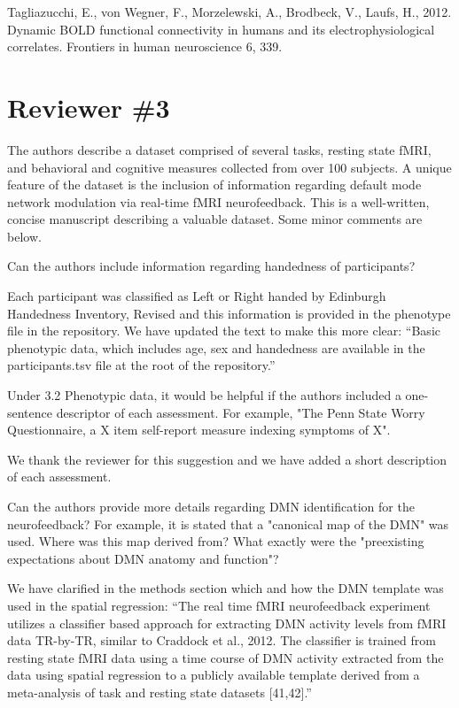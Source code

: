 \documentclass{article}
\newcommand{\RESPONSE}[1]{\textcolor{responseblue}{#1}}
\begin{document}
Tagliazucchi, E., von Wegner, F., Morzelewski, A., Brodbeck, V., Laufs, H., 2012. Dynamic BOLD functional connectivity in humans and its electrophysiological correlates. Frontiers in human neuroscience 6, 339.

\section*{Reviewer \#3}

The authors describe a dataset comprised of several tasks, resting state fMRI, and behavioral and cognitive measures collected from over 100 subjects. A unique feature of the dataset is the inclusion of information regarding default mode network modulation via real-time fMRI neurofeedback. This is a well-written, concise manuscript describing a valuable dataset. Some minor comments are below.

Can the authors include information regarding handedness of participants?

\RESPONSE{Each participant was classified as Left or Right handed by Edinburgh Handedness Inventory, Revised and this information is provided in the phenotype file in the repository. We have updated the text to make this more clear: ``Basic phenotypic data, which includes age, sex and handedness are available in the participants.tsv file at the root of the repository.''}

Under 3.2 Phenotypic data, it would be helpful if the authors included a one-sentence descriptor of each assessment. For example, "The Penn State Worry Questionnaire, a X item self-report measure indexing symptoms of X".

\RESPONSE{We thank the reviewer for this suggestion and we have added a short description of each assessment.}

Can the authors provide more details regarding DMN identification for the neurofeedback? For example, it is stated that a "canonical map of the DMN" was used. Where was this map derived from? What exactly were the "preexisting expectations about DMN anatomy and function"?

\RESPONSE{We have clarified in the methods section which and how the DMN template was used in the spatial regression: ``The real time fMRI neurofeedback experiment utilizes a classifier based approach for extracting DMN activity levels from fMRI data TR-by-TR, similar to Craddock et al., 2012. The classifier is trained from resting state fMRI data using a time course of DMN activity extracted from the data using spatial regression to a publicly available template derived from a meta-analysis of task and resting state datasets [41,42].'' }
\end{document}

